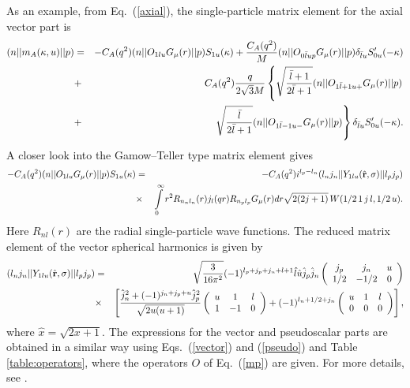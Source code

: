 As an example, from Eq.\ (\ref{axial}), the single-particle matrix element 
for the axial vector part is
\begin{eqnarray}\label{mp}
  (n||m_A(\kappa,u)||p)&=&-C_A(q^2)(n||O_{1lu}G_\mu(r)||p)S_{1u}(\kappa)+
  \frac{C_A(q^2)}{M}(n||O_{0\bar lup}G_\mu(r)||p)
  \delta_{\bar lu}S'_{0u}(-\kappa)\nonumber\\
  &+&C_A(q^2){q\over2\sqrt{3}M}\left\lbrace
    \sqrt{\bar l+1\over 2\bar l+1}
    (n||O_{1\bar l+1u+}G_\mu(r)||p)\right.\\
  &+&\left.\sqrt{\bar l\over 2\bar l+1}(n||
    O_{1\bar l-1u-}G_\mu(r)||p)\right\rbrace\delta_{\bar lu}S'_{0u}
  (-\kappa).\nonumber
\end{eqnarray}
A closer look into the Gamow--Teller type matrix element gives
\begin{eqnarray}
  -C_A(q^2)(n||O_{1lu}G_\mu(r)||p)S_{1u}(\kappa) &=& -C_A(q^2)
  i^{l_p-l_n}(l_nj_n||Y_{1lu}(\hat{\bf r},\sigma)||l_pj_p)\nonumber\\
  &\times&\int\limits_0^\infty r^2 R_{n_nl_n}(r)
  j_l(qr)R_{n_pl_p}G_\mu(r)dr
  \sqrt{2(2j+1)}\,W(1/2\,1\,j\,l,1/2\,u).
\end{eqnarray}
Here $R_{nl}(r)$ are the radial single-particle wave functions. The reduced
matrix element of the vector spherical harmonics is given by
\begin{eqnarray}
  (l_nj_n||Y_{1lu}(\hat{\bf r},\sigma)||l_pj_p)&=&
  \sqrt{3\over 16\pi^2}(-1)^{l_p+j_p+j_n+l+1}\hat l
  \hat u\hat j_p\hat j_n\left(\begin{array}{ccc} j_p & j_n & u \\ 1/2 & 
      -1/2 & 0
    \end{array}\right)\\
  &\times&\left[{\hat j_n^2+(-1)^{j_n+j_p+u}\hat j_p^2\over \sqrt{2u(u+1)}}
    \left(\begin{array}{ccc} u & 1 & l \\ 1 & -1 & 0 \end{array}\right)
    +(-1)^{l_n+1/2+j_n}\left(\begin{array}{ccc} u & 1 & l \\ 0 & 0 & 0 
      \end{array}
    \right)\right],\nonumber
\end{eqnarray}
where $\hat x = \sqrt{2x+1}$.
The expressions for the vector and pseudoscalar parts are obtained in a 
similar way
using Eqs.\ (\ref{vector}) and (\ref{pseudo}) and Table \ref{table:operators},
where the operators $O$ of Eq.\ (\ref{mp}) are given. For more details, see
\cite{mor60}. 

